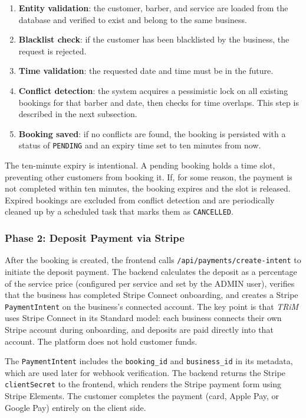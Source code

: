 \begin{enumerate}
    \item \textbf{Entity validation}: the customer, barber, and service are loaded from the database and verified to exist and belong to the same business.
    \item \textbf{Blacklist check}: if the customer has been blacklisted by the business, the request is rejected.
    \item \textbf{Time validation}: the requested date and time must be in the future.
    \item \textbf{Conflict detection}: the system acquires a pessimistic lock on all existing bookings for that barber and date, then checks for time overlaps. This step is described in the next subsection.
    \item \textbf{Booking saved}: if no conflicts are found, the booking is persisted with a status of \texttt{PENDING} and an expiry time set to ten minutes from now.
\end{enumerate}

The ten-minute expiry is intentional. A pending booking holds a time slot, preventing other customers from booking it. If, for some reason, the payment is not completed within ten minutes, the booking expires and the slot is released. Expired bookings are excluded from conflict detection and are periodically cleaned up by a scheduled task that marks them as \texttt{CANCELLED}.

\subsubsection*{Phase 2: Deposit Payment via Stripe}
After the booking is created, the frontend calls \texttt{/api/payments/create-intent} to initiate the deposit payment. The backend calculates the deposit as a percentage of the service price (configured per service and set by the ADMIN user), verifies that the business has completed Stripe Connect onboarding, and creates a Stripe \texttt{PaymentIntent} on the business's connected account. The key point is that \textit{TRiM} uses Stripe Connect in its Standard model: each business connects their own Stripe account during onboarding, and deposits are paid directly into that account. The platform does not hold customer funds.

The \texttt{PaymentIntent} includes the \texttt{booking\_id} and \texttt{business\_id} in its metadata, which are used later for webhook verification. The backend returns the Stripe \texttt{clientSecret} to the frontend, which renders the Stripe payment form using Stripe Elements. The customer completes the payment (card, Apple Pay, or Google Pay) entirely on the client side.

